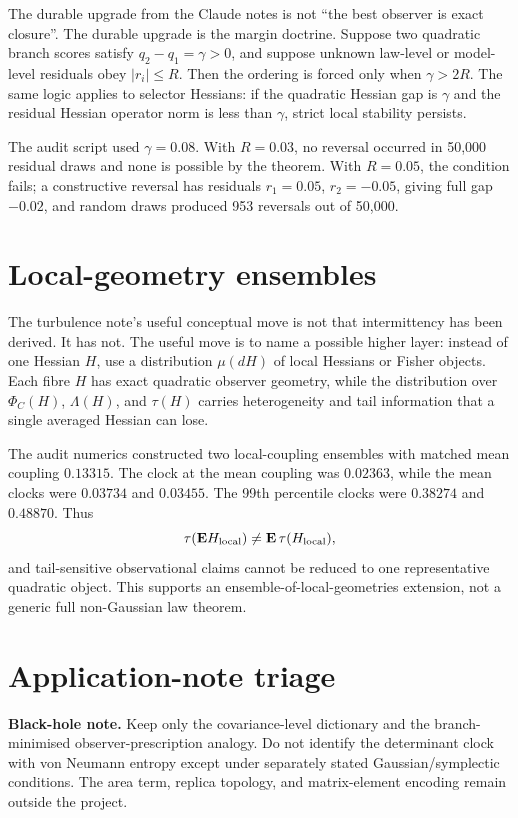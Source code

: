 \documentclass[11pt,a4paper]{article}
\numberwithin{equation}{section}
\theoremstyle{thmcompact}
\theoremstyle{remark}
\begin{document}
The durable upgrade from the Claude notes is not ``the best observer is exact
closure''. The durable upgrade is the margin doctrine. Suppose two quadratic
branch scores satisfy \(q_2-q_1=\gamma>0\), and suppose unknown law-level or
model-level residuals obey \(|r_i|\le R\). Then the ordering is forced only when
\(\gamma>2R\). The same logic applies to selector Hessians: if the quadratic
Hessian gap is \(\gamma\) and the residual Hessian operator norm is less than
\(\gamma\), strict local stability persists.

The audit script used \(\gamma=0.08\). With \(R=0.03\), no reversal occurred in
50,000 residual draws and none is possible by the theorem. With \(R=0.05\), the
condition fails; a constructive reversal has residuals \(r_1=0.05\),
\(r_2=-0.05\), giving full gap \(-0.02\), and random draws produced 953
reversals out of 50,000.

\section{Local-geometry ensembles}

The turbulence note's useful conceptual move is not that intermittency has been
derived. It has not. The useful move is to name a possible higher layer:
instead of one Hessian \(H\), use a distribution \(\mu(dH)\) of local Hessians
or Fisher objects. Each fibre \(H\) has exact quadratic observer geometry, while
the distribution over \(\Phi_C(H)\), \(\Lambda(H)\), and \(\tau(H)\) carries
heterogeneity and tail information that a single averaged Hessian can lose.

The audit numerics constructed two local-coupling ensembles with matched mean
coupling \(0.13315\). The clock at the mean coupling was \(0.02363\), while the
mean clocks were \(0.03734\) and \(0.03455\). The 99th percentile clocks were
\(0.38274\) and \(0.48870\). Thus
\[
  \tau(\mathbf E H_{\rm local}) \ne \mathbf E\,\tau(H_{\rm local}),
\]
and tail-sensitive observational claims cannot be reduced to one representative
quadratic object. This supports an ensemble-of-local-geometries extension, not a
generic full non-Gaussian law theorem.

\section{Application-note triage}

\textbf{Black-hole note.} Keep only the covariance-level dictionary and the
branch-minimised observer-prescription analogy. Do not identify the determinant
clock with von Neumann entropy except under separately stated Gaussian/symplectic
conditions. The area term, replica topology, and matrix-element encoding remain
outside the project.
\end{document}
